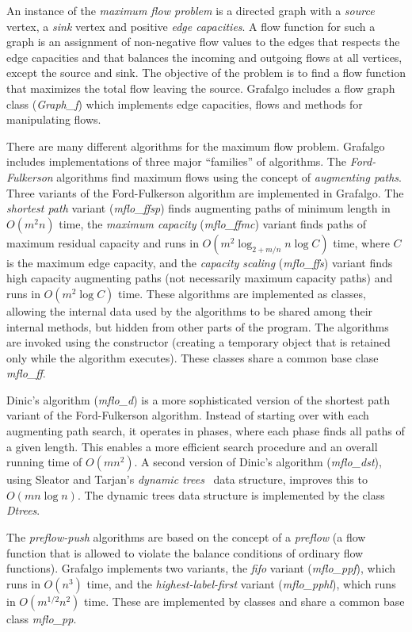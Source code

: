\documentclass[11pt]{article}
\begin{document}
An instance of the {\sl maximum flow problem} is a directed graph with a {\sl source} vertex,
a {\sl sink} vertex and positive {\sl edge capacities}. A flow function for such a graph is
an assignment of non-negative flow values to the edges that respects the edge capacities
and that balances the incoming and outgoing flows at all vertices, except the source and sink.
The objective of the problem is to find a flow function that maximizes the total flow leaving
the source.
Grafalgo includes a flow graph class ({\sl Graph\_f}) which implements edge capacities, flows
and methods for manipulating flows.

There are many different algorithms for the maximum flow problem. Grafalgo includes
implementations of three major ``families'' of algorithms.
The {\sl Ford-Fulkerson} algorithms find maximum flows using the concept of {\sl augmenting paths}.
Three variants of the Ford-Fulkerson algorithm are implemented in Grafalgo.
The {\sl shortest path} variant ({\sl mflo\_ffsp}) finds augmenting paths of minimum length in $O(m^2n)$ time,
the {\sl maximum capacity} ({\sl mflo\_ffmc}) variant finds paths of maximum residual capacity
and runs in $O(m^2 \log_{2+m/n} n \log C)$ time, where $C$ is the maximum edge capacity,
and the {\sl capacity scaling} ({\sl mflo\_ffs}) variant finds high capacity augmenting paths (not necessarily
maximum capacity paths) and runs in $O(m^2 \log C)$ time.
These algorithms are implemented as classes,
allowing the internal data used by the algorithms to be shared among their internal methods,
but hidden from other parts of the program. The algorithms are invoked using the constructor
(creating a temporary object that is retained only while the algorithm executes).
These classes share a common base clase {\sl mflo\_ff}.

Dinic's algorithm ({\sl mflo\_d}) is a more sophisticated version of the shortest path variant of the
Ford-Fulkerson algorithm. Instead of starting over with each augmenting path search,
it operates in phases, where each phase finds all paths of a given length. This enables
a more efficient search procedure and an overall running time of $O(mn^2)$.
A second version of Dinic's algorithm ({\sl mflo\_dst}), using Sleator and Tarjan's 
{\sl dynamic trees}~\cite{ST81} data structure,  improves this to $O(mn \log n)$.
The dynamic trees data structure is implemented by the class {\sl Dtrees}.

The {\sl preflow-push} algorithms are based on the concept of a {\sl preflow}
(a flow function that is allowed to violate the balance conditions of ordinary flow functions).
Grafalgo implements two variants, the {\sl fifo} variant ({\sl mflo\_ppf}), which runs in $O(n^3)$ time,
and the {\sl highest-label-first} variant ({\sl mflo\_pphl}), which runs in $O(m^{1/2}n^2)$ time.
These are implemented by classes  and share
a common base class {\sl mflo\_pp}.
\end{document}

